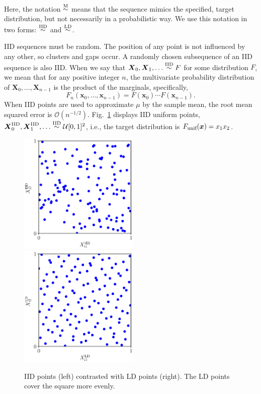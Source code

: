 \documentclass[graybox]{svmult}
\begin{document}
Here, the notation $\overset{\textup{M}}{\sim}$ means that the sequence mimics the specified, target distribution, but not necessarily in a probabilistic way.  We  use this notation in two forms:  $\overset{\textup{IID}}{\sim}$ and $\overset{\textup{LD}}{\sim}$.

IID sequences must be random. The position of any point is not influenced by any other, so clusters and gaps occur.  A randomly chosen subsequence of an IID sequence is also IID.  When we say that $\boldsymbol{X}_0, \boldsymbol{X}_1, \ldots \overset{\textup{IID}}{\sim} F$ for some distribution $F$, we mean that for any positive integer $n$, the  multivariate probability distribution of $\boldsymbol{X}_0, \ldots, \boldsymbol{X}_{n-1}$ is the product of the marginals, specifically,
\begin{equation*}
	F_{n}(\boldsymbol{x}_0, \ldots, \boldsymbol{x}_{n-1}) = F(\boldsymbol{x}_0) \cdots  F(\boldsymbol{x}_{n-1}).
\end{equation*}
When IID points are used to approximate $\mu$ by the sample mean, the root mean squared error is $\mathcal{O}(n^{-1/2})$.  Fig.~\ref{fig:comparePts} displays IID uniform points, $\boldsymbol{X}^{\textup{IID}}_0, \boldsymbol{X}^{\textup{IID}}_1, \ldots \overset{\textup{IID}}{\sim} \mathcal{U}[0,1]^2$, i.e.,  the target distribution is $F_{\textup{unif}}(\boldsymbol{x}) = x_1 x_2$.


\begin{figure}[t]
	\includegraphics[height=5.8cm]{QMCSoftwareArticle/vfigs/dd_iid_uniform_pts.eps}
	\quad
	\includegraphics[height=5.8cm]{QMCSoftwareArticle/vfigs/dd_sobol_pts.eps}
	\caption{IID points (left) contrasted with LD points (right).  The LD points cover the square more evenly.}
	\label{fig:comparePts}
\end{figure}
\end{document}
